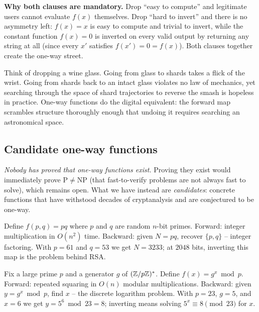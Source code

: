 \begin{whybox}
\textbf{Why both clauses are mandatory.} Drop ``easy to compute'' and legitimate users cannot evaluate $f(x)$ themselves. Drop ``hard to invert'' and there is no asymmetry left: $f(x) = x$ is easy to compute and trivial to invert, while the constant function $f(x) = 0$ is inverted on every valid output by returning any string at all (since every $x'$ satisfies $f(x') = 0 = f(x)$). Both clauses together create the one-way street.
\end{whybox}

\begin{intuitionbox}
Think of dropping a wine glass. Going from glass to shards takes a flick of the wrist. Going from shards back to an intact glass violates no law of mechanics, yet searching through the space of shard trajectories to reverse the smash is hopeless in practice. One-way functions do the digital equivalent: the forward map scrambles structure thoroughly enough that undoing it requires searching an astronomical space.
\end{intuitionbox}

\subsection{Candidate one-way functions}
\label{ch08:candidates}

\emph{Nobody has proved that one-way functions exist.} Proving they exist would immediately prove $\mathrm P \ne \mathrm{NP}$ (that fast-to-verify problems are not always fast to solve), which remains open. What we have instead are \emph{candidates}: concrete functions that have withstood decades of cryptanalysis and are conjectured to be one-way.

\begin{example}
\label{ch08:ex-mult}
Define $f(p,q) = pq$ where $p$ and $q$ are random $n$-bit primes. Forward: integer multiplication in $O(n^2)$ time. Backward: given $N=pq$, recover $\{p,q\}$ -- integer factoring. With $p=61$ and $q=53$ we get $N=3233$; at $2048$ bits, inverting this map is the problem behind RSA.
\end{example}

\begin{example}
\label{ch08:ex-exp}
Fix a large prime $p$ and a generator $g$ of $(\mathbb{Z}/p\mathbb{Z})^{*}$. Define $f(x) = g^{x} \bmod p$. Forward: repeated squaring in $O(n)$ modular multiplications. Backward: given $y=g^x \bmod p$, find $x$ -- the discrete logarithm problem. With $p=23$, $g=5$, and $x=6$ we get $y = 5^6 \bmod 23 = 8$; inverting means solving $5^{x}\equiv 8 \pmod{23}$ for $x$.
\end{example}

